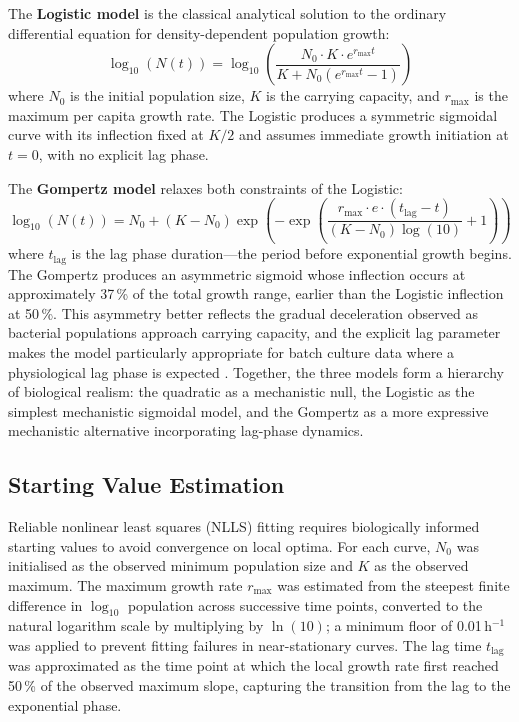\documentclass[11pt,a4paper]{article}
\begin{document}
The \textbf{Logistic model} is the classical analytical solution to the
ordinary differential equation for density-dependent population growth:
\begin{equation}
    \log_{10}(N(t)) = \log_{10}\!\left(
        \frac{N_0 \cdot K \cdot e^{r_{\max}t}}{K + N_0\!\left(e^{r_{\max}t} - 1\right)}
    \right)
\end{equation}
where $N_0$ is the initial population size, $K$ is the carrying
capacity, and $r_{\max}$ is the maximum per capita growth rate. The
Logistic produces a symmetric sigmoidal curve with its inflection fixed
at $K/2$ and assumes immediate growth initiation at $t = 0$, with no
explicit lag phase.

The \textbf{Gompertz model} \citep{Zwietering1990} relaxes both
constraints of the Logistic:
\begin{equation}
    \log_{10}(N(t)) = N_0 + (K - N_0)\exp\!\left(
        -\exp\!\left(
            \frac{r_{\max} \cdot e \cdot (t_{\text{lag}} - t)}
                 {(K - N_0)\log(10)} + 1
        \right)
    \right)
\end{equation}
where $t_{\text{lag}}$ is the lag phase duration---the period before
exponential growth begins. The Gompertz produces an asymmetric sigmoid
whose inflection occurs at approximately 37\,\% of the total growth
range, earlier than the Logistic inflection at 50\,\%. This asymmetry
better reflects the gradual deceleration observed as bacterial
populations approach carrying capacity, and the explicit lag parameter
makes the model particularly appropriate for batch culture data where a
physiological lag phase is expected \citep{baranyi1994}. Together, the
three models form a hierarchy of biological realism: the quadratic as a
mechanistic null, the Logistic as the simplest mechanistic sigmoidal
model, and the Gompertz as a more expressive mechanistic alternative
incorporating lag-phase dynamics.

\subsection{Starting Value Estimation}

Reliable nonlinear least squares (NLLS) fitting requires biologically
informed starting values to avoid convergence on local optima. For each
curve, $N_0$ was initialised as the observed minimum population size and
$K$ as the observed maximum. The maximum growth rate $r_{\max}$ was
estimated from the steepest finite difference in $\log_{10}$ population
across successive time points, converted to the natural logarithm scale
by multiplying by $\ln(10)$; a minimum floor of 0.01\,h$^{-1}$ was
applied to prevent fitting failures in near-stationary curves. The lag
time $t_{\text{lag}}$ was approximated as the time point at which the
local growth rate first reached 50\,\% of the observed maximum slope,
capturing the transition from the lag to the exponential phase.
\end{document}
